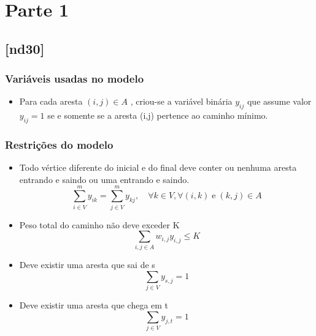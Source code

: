 \documentclass[11pt,letterpaper]{article}
\begin{document}

\section{Parte 1}

\subsection{{[}nd30{]}}
\subsubsection*{Variáveis usadas no modelo}
\begin{itemize}
\item Para cada aresta $(i,j) \in A$ , criou-se
  a variável binária $y_{ij}$ que assume valor $y_{ij}=1$ se e somente se a aresta (i,j)
  pertence ao caminho mínimo.
\end{itemize}

\subsubsection*{Restrições do modelo}
\begin{itemize}

\item Todo vértice diferente do inicial e do final deve conter ou
  nenhuma aresta entrando e saindo ou uma entrando e saindo.
  \begin{equation*}
    \sum_{i \in V}^{m}y_{ik}=\sum_{j \in V}^{m}y_{kj},\quad \forall k \in V,
    \forall (i,k) \; \text{e} \; (k,j) \in A 
  \end{equation*}

\item Peso total do caminho não deve exceder K
  \begin{equation*}
    \sum_{{i,j} \in A}w_{i,j}y_{i,j} \leq K
  \end{equation*}

\item Deve existir uma aresta que sai de s
  \begin{equation*}
    \sum_{j \in V}y_{s,j} = 1 
  \end{equation*}

\item Deve existir uma aresta que chega em t
  \begin{equation*}
    \sum_{j \in V}y_{j,t} = 1 
  \end{equation*}

\end{itemize}
\end{document}
